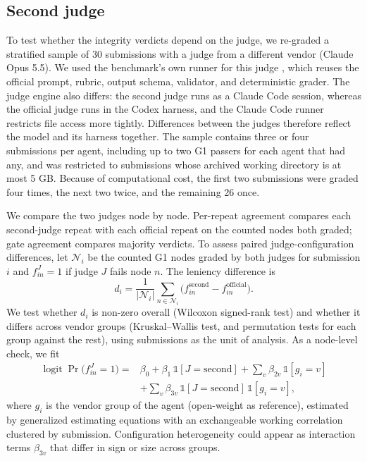 \documentclass[preprint,12pt,authoryear]{elsarticle}
\begin{document}
\subsection{Second judge}\label{sec:judge2}

To test whether the integrity verdicts depend on the judge, we re-graded a stratified sample of 30 submissions with a judge from a different vendor (Claude Opus 5.5). We used the benchmark's own runner for this judge \citep{kim2026unknown}, which reuses the official prompt, rubric, output schema, validator, and deterministic grader. The judge engine also differs: the second judge runs as a Claude Code session, whereas the official judge runs in the Codex harness, and the Claude Code runner restricts file access more tightly. Differences between the judges therefore reflect the model and its harness together. The sample contains three or four submissions per agent, including up to two G1 passers for each agent that had any, and was restricted to submissions whose archived working directory is at most 5 GB. Because of computational cost, the first two submissions were graded four times, the next two twice, and the remaining 26 once.

We compare the two judges node by node. Per-repeat agreement compares each second-judge repeat with each official repeat on the counted nodes both graded; gate agreement compares majority verdicts. To assess paired judge-configuration differences, let $\mathcal{N}_i$ be the counted G1 nodes graded by both judges for submission $i$ and $f^{J}_{in}=1$ if judge $J$ fails node $n$. The leniency difference is
\begin{equation}
d_i = \frac{1}{|\mathcal{N}_i|}\sum_{n\in\mathcal{N}_i}\bigl(f^{\text{second}}_{in}-f^{\text{official}}_{in}\bigr).
\label{eq:d}
\end{equation}
We test whether $d_i$ is non-zero overall (Wilcoxon signed-rank test) and whether it differs across vendor groups (Kruskal--Wallis test, and permutation tests for each group against the rest), using submissions as the unit of analysis. As a node-level check, we fit
\begin{equation}
\begin{split}
\operatorname{logit}\Pr\bigl(f^{J}_{in}=1\bigr) = {}& \beta_0 + \beta_1\,\mathbb{1}[J=\text{second}] + \sum_{v}\beta_{2v}\,\mathbb{1}[g_i=v]\\
&+ \sum_{v}\beta_{3v}\,\mathbb{1}[J=\text{second}]\,\mathbb{1}[g_i=v],
\end{split}
\label{eq:gee}
\end{equation}
where $g_i$ is the vendor group of the agent (open-weight as reference), estimated by generalized estimating equations with an exchangeable working correlation clustered by submission. Configuration heterogeneity could appear as interaction terms $\beta_{3v}$ that differ in sign or size across groups.
\end{document}
